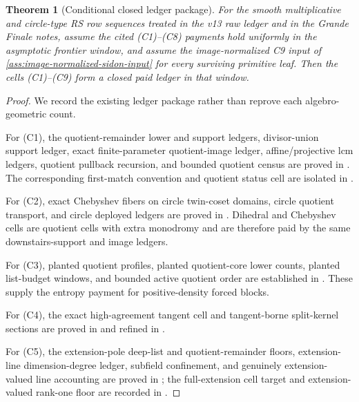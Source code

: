 \documentclass[11pt,a4paper]{amsart}
\numberwithin{equation}{section}
\newtheorem{theorem}{Theorem}[section]
\theoremstyle{remark}
\begin{document}
\begin{theorem}[Conditional closed ledger package]\label{thm:closed-ledger-package}
For the smooth multiplicative and circle-type RS row sequences treated in the v13 raw ledger and in the Grande Finale notes, assume the cited \textup{(C1)--(C8)} payments hold uniformly in the asymptotic frontier window, and assume the image-normalized C9 input of \cref{ass:image-normalized-sidon-input} for every surviving primitive leaf.  Then the cells \textup{(C1)--(C9)} form a closed paid ledger in that window.
\end{theorem}

\begin{proof}
We record the existing ledger package rather than reprove each algebro-geometric count.

For \textup{(C1)}, the quotient-remainder lower and support ledgers, divisor-union support ledger, exact finite-parameter quotient-image ledger, affine/projective lcm ledgers, quotient pullback recursion, and bounded quotient census are proved in \cite[quotient-remainder, quotient support, quotient-image, and bounded-census ledgers]{Cho26CapV13}.  The corresponding first-match convention and quotient status cell are isolated in \cite{Cho26Grande}.

For \textup{(C2)}, exact Chebyshev fibers on circle twin-coset domains, circle quotient transport, and circle deployed ledgers are proved in \cite[Chebyshev and circle sections]{Cho26CapV13}.  Dihedral and Chebyshev cells are quotient cells with extra monodromy and are therefore paid by the same downstairs-support and image ledgers.

For \textup{(C3)}, planted quotient profiles, planted quotient-core lower counts, planted list-budget windows, and bounded active quotient order are established in \cite[planted quotient profile and bounded quotient census]{Cho26CapV13}.  These supply the entropy payment for positive-density forced blocks.

For \textup{(C4)}, the exact high-agreement tangent cell and tangent-borne split-kernel sections are proved in \cite[high-agreement tangent exact cell and split-kernel tangent-borne theorem]{Cho26CapV13} and refined in \cite[exact high-agreement tangent cell]{Cho26Grande}.

For \textup{(C5)}, the extension-pole deep-list and quotient-remainder floors, extension-line dimension-degree ledger, subfield confinement, and genuinely extension-valued line accounting are proved in \cite[extension-pole and extension-line ledgers]{Cho26CapV13}; the full-extension cell target and extension-valued rank-one floor are recorded in \cite{Cho26Grande}.


\end{proof}
\end{document}
